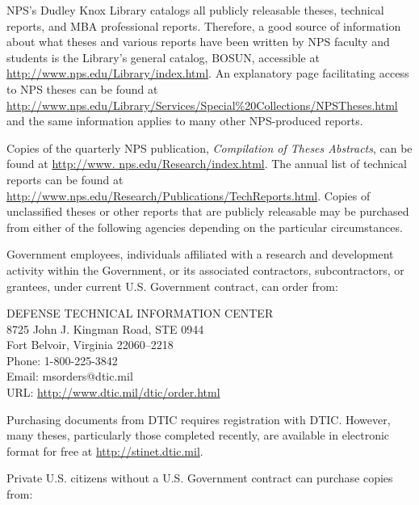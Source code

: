 
\newpage

\renewcommand{\leftmark}{\textsc{Obtaining a Thesis}}

\footnotesize{
NPS's Dudley Knox Library catalogs all publicly releasable theses, technical reports, and MBA professional reports. Therefore, a good source of information about what theses and various reports have been written by NPS faculty and students is the Library's general catalog, BOSUN, accessible at \url{http://www.nps.edu/Library/index.html}. An explanatory page facilitating access to NPS theses can be found at \url{http://www.nps.edu/Library/Services/Special\%20Collections/NPSTheses.html} and the same information applies to many other NPS-produced reports.

Copies of the quarterly NPS publication, \textit{Compilation of Theses Abstracts}, can be found at \url{http://www. nps.edu/Research/index.html}. The annual list of technical reports can be found at \url{http://www.nps.edu/Research/Publications/TechReports.html}. Copies of unclassified theses or other reports that are publicly releasable may be purchased from either of the following agencies depending on the particular circumstances.

\vspace{1em}
Government employees, individuals affiliated with a research and development activity within the Government, or its associated contractors, subcontractors, or grantees, under current U.S. Government contract, can order from:

\vspace{-1em}
\begin{center}
DEFENSE TECHNICAL INFORMATION CENTER\\
8725 John J. Kingman Road, STE 0944\\
Fort Belvoir, Virginia 22060--2218\\
Phone: 1-800-225-3842\\
Email: msorders@dtic.mil\\
URL: \url{http://www.dtic.mil/dtic/order.html}
\end{center}

\vspace{-1em}
Purchasing documents from DTIC requires registration with DTIC. However, many theses, particularly those completed recently, are available in electronic format for free at \url{http://stinet.dtic.mil}.

\vspace{1em}
Private U.S. citizens without a U.S. Government contract can purchase copies from:

}
